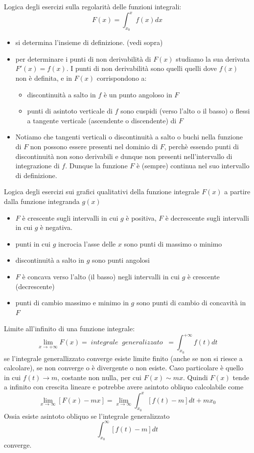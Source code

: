\documentclass[a4paper, 9pt]{report}
\begin{document}
Logica degli esercizi sulla regolarità delle funzioni integrali:
\[
    F(x) = \int_{x_0}^{x} f(x)dx
\]
\begin{itemize}
    \item si determina l'insieme di definizione. (vedi sopra)
    \item per determinare i punti di non derivabilità di $F(x)$ studiamo la sua derivata $F'(x) = f(x)$. I punti di non derivabilità sono quelli quelli dove $f(x)$ non è definita, e in $F(x)$ corrispondono a:
    \begin{itemize}
        \item discontinuità a salto in $f$ è un punto angoloso in $F$
        \item punti di asintoto verticale di $f$ sono cuspidi (verso l'alto o il basso) o flessi a tangente verticale (ascendente o discendente) di $F$
    \end{itemize}
    \item Notiamo che tangenti verticali o discontinuità a salto o buchi nella funzione di $F$ non possono essere presenti nel dominio di $F$, perchè essendo punti di discontinuità non sono derivabili e dunque non presenti nell'intervallo di integrazione di $f$.\newline
    Dunque la funzione $F$ è (sempre) continua nel suo intervallo di definizione.
\end{itemize}
Logica degli esercizi sui grafici qualitativi della funzione integrale $F(x)$ a partire dalla funzione integranda $g(x)$
\begin{itemize}
    \item $F$ è crescente sugli intervalli in cui $g$ è positiva, $F$ è decrescente sugli intervalli in cui $g$ è negativa.
    \item punti in cui $g$ incrocia l'asse delle $x$ sono punti di massimo o minimo
    \item discontinuità a salto in $g$ sono punti angolosi
    \item $F$ è concava verso l'alto (il basso) negli intervalli in cui $g$ è crescente (decrescente)
    \item punti di cambio massimo e minimo in $g$ sono punti di cambio di concavità in $F$
\end{itemize}
Limite all'infinito di una funzione integrale:
\[
    \lim_{x\rightarrow +\infty}F(x) = \; integrale \;\;generalizzato \;\;= \int_{x_0}^{+\infty}f(t)dt
\]
se l'integrale generallizzato converge esiste limite finito (anche se non si riesce a calcolare), se non converge o è divergente o non esiste.\newline
Caso particolare è quello in cui $f(t) \rightarrow m$, costante non nulla, per cui $F(x) \sim  mx$. Quindi $F(x)$ tende a infinito con crescita lineare e potrebbe avere asintoto obliquo calcolabile come 
\[
    \lim_{x\rightarrow \infty}[F(x)-mx] = \lim_{x\rightarrow \infty}\int_{x_0}^{x}[f(t)-m]dt + mx_0
\]
Ossia esiste asintoto obliquo se l'integrale generalizzato
\[
    \int_{x_0}^{\infty}[f(t)-m]dt
\]
converge.
\end{document}
